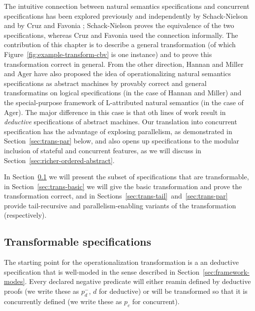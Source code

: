 The intuitive connection between natural semantics specifications and
concurrent specifications has been explored previously and
independently by Schack-Nielson \cite{schacknielsen07induction} and by
Cruz and Favonia \cite{cruz12parallel}; Schack-Nielson proves the
equivalence of the two specifications, whereas Cruz and Favonia used
the connection informally. The contribution of this chapter is to
describe a general transformation (of which
Figure~\ref{fig:example-transform-cbv} is one instance) and to prove
this transformation correct in general. From the other direction,
Hannan and Miller \cite{hannan92operational} and Ager
\cite{ager04natural} have also proposed the idea of operationalizing
natural semantics specifications as abstract machines by provably
correct and general transformatins on logical specifications (in the
case of Hannan and Miller) and the special-purpose framework of
L-attributed natural semantics (in the case of Ager). The major
difference in this case is that oth lines of work result in {\it
  deductive} specifications of abstract machines. Our translation into
concurrent specification has the advantage of explosing parallelism,
as demonstrated in Section~\ref{sec:trans-par} below, and also opens
up specifications to the modular inclusion of stateful and concurrent
features, as we will discuss in
Section~\ref{sec:richer-ordered-abstract}.

In Section~\ref{sec:trans-subset} we will present the subset of
specifications that are transformable, in
Section~\ref{sec:trans-basic} we will give the basic transformation
and prove the transformation correct, and in
Sections~\ref{sec:trans-tail}~and~\ref{sec:trans-par} provide
tail-recursive and parallelism-enabling variants of the transformation
(respectively).

\subsection{Transformable specifications}
\label{sec:trans-subset}

The starting point for the operationalization transformation is a an
deductive specification that is well-moded in the sense described in
Section~\ref{sec:framework-modes}. Every declared negative predicate
will either reamin defined by deductive proofs (we write these as
$p_d^-$, $d$ for deductive) or will be transformed so that it is
concurrently defined (we write these as $p_c$ for concurrent).

